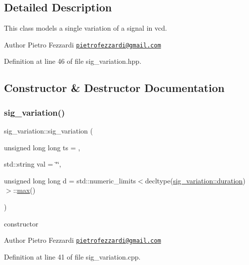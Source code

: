 \subsection{Detailed Description}
This class models a single variation of a signal in vcd. 

\begin{DoxyAuthor}{Author}
Pietro Fezzardi \href{mailto:pietrofezzardi@gmail.com}{\tt pietrofezzardi@gmail.\+com} 
\end{DoxyAuthor}


Definition at line 46 of file sig\+\_\+variation.\+hpp.



\subsection{Constructor \& Destructor Documentation}
\mbox{\label{structsig__variation_a662a07a549ae57dec775ee87b34178b2}} 
\subsubsection{\texorpdfstring{sig\+\_\+variation()}{sig\_variation()}}
{\footnotesize\ttfamily sig\+\_\+variation\+::sig\+\_\+variation (\begin{DoxyParamCaption}\item[{unsigned long long}]{ts = {},  }\item[{std\+::string}]{val = {\ttfamily \char`\"{}\char`\"{}},  }\item[{unsigned long long}]{d = {\ttfamily std\+:\+:numeric\+\_\+limits$<$decltype(\hyperlink{structsig__variation_a9c3dba4fe347f37cd24dae789e79f815}{sig\+\_\+variation\+::duration})$>$\+:\+:\hyperlink{tutorial__pact__2019_2Target-Customization_2first_2hint_8c_a28f422940797ea297699ba55d89171c5}{max}()} }\end{DoxyParamCaption})}



constructor 

\begin{DoxyAuthor}{Author}
Pietro Fezzardi \href{mailto:pietrofezzardi@gmail.com}{\tt pietrofezzardi@gmail.\+com} 
\end{DoxyAuthor}


Definition at line 41 of file sig\+\_\+variation.\+cpp.



